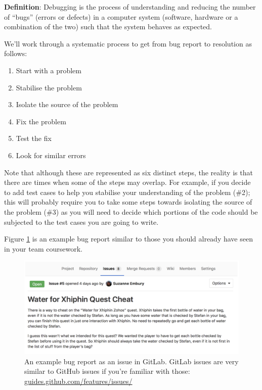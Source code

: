 \documentclass[
]{book}
\providecommand{\tightlist}{%
  \setlength{\itemsep}{0pt}\setlength{\parskip}{0pt}}
\begin{document}
\textbf{Definition}: Debugging is the process of understanding and reducing the number of ``bugs'' (errors or defects) in a computer system (software, hardware or a combination of the two) such that the system behaves as expected.

We'll work through a systematic process to get from bug report to resolution as follows:

\begin{enumerate}
\def\labelenumi{\arabic{enumi}.}
\tightlist
\item
  Start with a problem
\item
  Stabilise the problem
\item
  Isolate the source of the problem
\item
  Fix the problem
\item
  Test the fix
\item
  Look for similar errors
\end{enumerate}

Note that although these are represented as six distinct steps, the reality is that there are times when some of the steps may overlap. For example, if you decide to add test cases to help you stabilise your understanding of the problem (\#2); this will probably require you to take some steps towards isolating the source of the problem (\#3) as you will need to decide which portions of the code should be subjected to the test cases you are going to write.

Figure \ref{fig:issue5-fig} is an example bug report similar to those you should already have seen in your team coursework.

\begin{figure}

{\centering \includegraphics[width=1\linewidth]{images/issue5} 

}

\caption{An example bug report as an issue in GitLab. GitLab issues are very similar to GitHub issues if you're familiar with those: \href{https://guides.github.com/features/issues/}{guides.github.com/features/issues/}}\label{fig:issue5-fig}
\end{figure}
\end{document}
